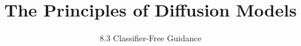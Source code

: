 ﻿%

\graphicspath{{../images/}}
\title{The Principles of Diffusion Models}
\subtitle{8.3 Classifier-Free Guidance}


\begin{frame}
    \titlepage
\end{frame}



